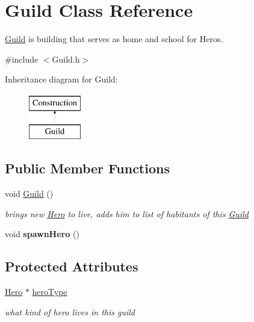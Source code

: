 \hypertarget{class_guild}{}\section{Guild Class Reference}
\label{class_guild}


\hyperlink{class_guild}{Guild} is building that serves as home and school for Heros.  




{\ttfamily \#include $<$Guild.\+h$>$}

Inheritance diagram for Guild\+:\begin{figure}[H]
\begin{center}
\leavevmode
\includegraphics[height=2.000000cm]{class_guild}
\end{center}
\end{figure}
\subsection*{Public Member Functions}
\begin{DoxyCompactItemize}
\item 
void \hyperlink{class_guild_a8fd4c37c93889d371c363309be413cd6}{Guild} ()\hypertarget{class_guild_a8fd4c37c93889d371c363309be413cd6}{}\label{class_guild_a8fd4c37c93889d371c363309be413cd6}

\begin{DoxyCompactList}\small\item\em brings new \hyperlink{class_hero}{Hero} to live, adds him to list of habitants of this \hyperlink{class_guild}{Guild} \end{DoxyCompactList}\item 
void {\bfseries spawn\+Hero} ()\hypertarget{class_guild_a5a671abed58577f1072bb3ce589d6f24}{}\label{class_guild_a5a671abed58577f1072bb3ce589d6f24}

\end{DoxyCompactItemize}
\subsection*{Protected Attributes}
\begin{DoxyCompactItemize}
\item 
\hyperlink{class_hero}{Hero} $\ast$ \hyperlink{class_guild_a96e8022f289bed1be880b03302d6de64}{hero\+Type}\hypertarget{class_guild_a96e8022f289bed1be880b03302d6de64}{}\label{class_guild_a96e8022f289bed1be880b03302d6de64}

\begin{DoxyCompactList}\small\item\em what kind of hero lives in this guild \end{DoxyCompactList}\end{DoxyCompactItemize}


